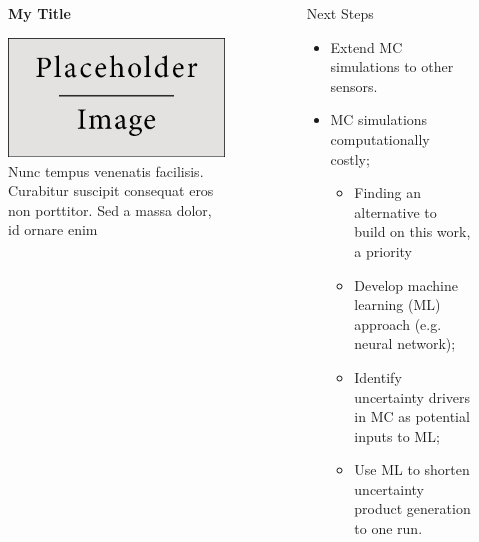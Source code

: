 \documentclass[final]{beamer}
\newlength{\sepwid}
\newlength{\onecolwid}
\newlength{\twocolwid}
\begin{document}
\begin{frame}[t]
\begin{columns}[t]
\begin{column}{\twocolwid}
\begin{columns}[t,totalwidth=\twocolwid]
\begin{column}{\onecolwid}
\begin{figure}
\centering
\textbf{My Title}\par\medskip
\includegraphics[width=0.8\linewidth]{placeholder.jpg}
\\{Nunc tempus venenatis facilisis. Curabitur suscipit consequat eros non porttitor. Sed a massa dolor, id ornare enim}
\end{figure}


\end{column} %

\end{columns} %

\end{column} %

\begin{column}{\sepwid}\end{column} %

\begin{column}{\onecolwid} %


\begin{block}{Next Steps}
\begin{itemize}
\item Extend MC simulations to other sensors.
\item MC simulations computationally costly;
	\begin{itemize}
	\item Finding an alternative to build on this work, a priority
	\item Develop machine learning (ML) approach (e.g. neural network);
	\item Identify uncertainty drivers in MC as potential inputs to ML;
 	\item Use ML to shorten uncertainty product generation to one run. 
	\end{itemize}
\end{itemize}


\end{block}
\end{column}
\end{columns}
\end{frame}
\end{document}
